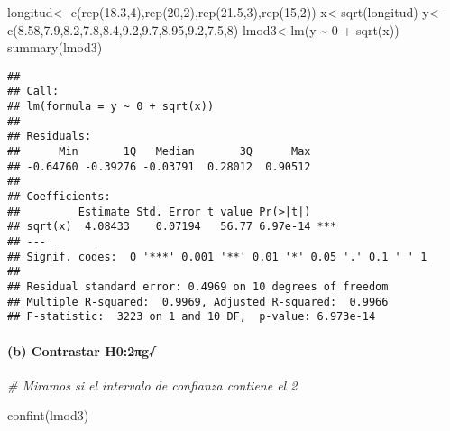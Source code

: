 \documentclass[
]{article}
\newenvironment{Shaded}{\begin{snugshade}}{\end{snugshade}}
\newcommand{\CommentTok}[1]{\textcolor[rgb]{0.56,0.35,0.01}{\textit{#1}}}
\newcommand{\DecValTok}[1]{\textcolor[rgb]{0.00,0.00,0.81}{#1}}
\newcommand{\FloatTok}[1]{\textcolor[rgb]{0.00,0.00,0.81}{#1}}
\newcommand{\FunctionTok}[1]{\textcolor[rgb]{0.00,0.00,0.00}{#1}}
\newcommand{\NormalTok}[1]{#1}
\newcommand{\OtherTok}[1]{\textcolor[rgb]{0.56,0.35,0.01}{#1}}
\newcommand{\SpecialCharTok}[1]{\textcolor[rgb]{0.00,0.00,0.00}{#1}}
\begin{document}
\begin{Shaded}
\begin{Highlighting}[]
\NormalTok{longitud}\OtherTok{\textless{}{-}} \FunctionTok{c}\NormalTok{(}\FunctionTok{rep}\NormalTok{(}\FloatTok{18.3}\NormalTok{,}\DecValTok{4}\NormalTok{),}\FunctionTok{rep}\NormalTok{(}\DecValTok{20}\NormalTok{,}\DecValTok{2}\NormalTok{),}\FunctionTok{rep}\NormalTok{(}\FloatTok{21.5}\NormalTok{,}\DecValTok{3}\NormalTok{),}\FunctionTok{rep}\NormalTok{(}\DecValTok{15}\NormalTok{,}\DecValTok{2}\NormalTok{))}
\NormalTok{x}\OtherTok{\textless{}{-}}\FunctionTok{sqrt}\NormalTok{(longitud)}
\NormalTok{y}\OtherTok{\textless{}{-}}\FunctionTok{c}\NormalTok{(}\FloatTok{8.58}\NormalTok{,}\FloatTok{7.9}\NormalTok{,}\FloatTok{8.2}\NormalTok{,}\FloatTok{7.8}\NormalTok{,}\FloatTok{8.4}\NormalTok{,}\FloatTok{9.2}\NormalTok{,}\FloatTok{9.7}\NormalTok{,}\FloatTok{8.95}\NormalTok{,}\FloatTok{9.2}\NormalTok{,}\FloatTok{7.5}\NormalTok{,}\DecValTok{8}\NormalTok{)}
\NormalTok{lmod3}\OtherTok{\textless{}{-}}\FunctionTok{lm}\NormalTok{(y }\SpecialCharTok{\textasciitilde{}} \DecValTok{0} \SpecialCharTok{+} \FunctionTok{sqrt}\NormalTok{(x))}
\FunctionTok{summary}\NormalTok{(lmod3)}
\end{Highlighting}
\end{Shaded}

\begin{verbatim}
## 
## Call:
## lm(formula = y ~ 0 + sqrt(x))
## 
## Residuals:
##      Min       1Q   Median       3Q      Max 
## -0.64760 -0.39276 -0.03791  0.28012  0.90512 
## 
## Coefficients:
##         Estimate Std. Error t value Pr(>|t|)    
## sqrt(x)  4.08433    0.07194   56.77 6.97e-14 ***
## ---
## Signif. codes:  0 '***' 0.001 '**' 0.01 '*' 0.05 '.' 0.1 ' ' 1
## 
## Residual standard error: 0.4969 on 10 degrees of freedom
## Multiple R-squared:  0.9969, Adjusted R-squared:  0.9966 
## F-statistic:  3223 on 1 and 10 DF,  p-value: 6.973e-14
\end{verbatim}

\hypertarget{b-contrastar-h02ux3c0g}{%
\paragraph{(b) Contrastar H0:2πg√}\label{b-contrastar-h02ux3c0g}}

\begin{Shaded}
\begin{Highlighting}[]
\CommentTok{\# Miramos si el intervalo de confianza contiene el 2}

\FunctionTok{confint}\NormalTok{(lmod3)}
\end{Highlighting}
\end{Shaded}
\end{document}
